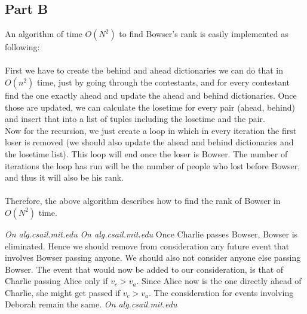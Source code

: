 \documentclass[12pt,twoside]{article}
\begin{document}
\begin{problems}
\section*{Part B}

\problem
\begin{problemparts}
\problempart 

An algorithm of time $O(N^2)$ to find Bowser's rank is easily implemented as following:\\\\
First we have to create the behind and ahead dictionaries we can do that in $O(n^2)$ time, just by going through the contestants, and for every contestant find the one exactly ahead and update the ahead and behind dictionaries. Once those are updated, we can calculate the losetime for every pair (ahead, behind) and insert that into a list of tuples including the losetime and the pair. 
\\ Now for the recursion, we just create a loop in which in every iteration the first loser is removed (we should also update the ahead and behind dictionaries and the losetime list). This loop will end once the loser is Bowser. The number of iterations the loop has run will be the number of people who lost before Bowser, and thus it will also be his rank. \\\\

Therefore, the above algorithm describes how to find the rank of Bowser in $O(N^2)$ time.

\problempart \emph{On alg.csail.mit.edu}
\problempart \emph{On alg.csail.mit.edu}
\problempart 
Once Charlie passes Bowser, Bowser is eliminated. Hence we should remove from consideration any future event that involves Bowser passing anyone. We should also not consider anyone else passing Bowser. The event that would now be added to our consideration, is that of Charlie passing Alice only if $v_c>v_a$. Since Alice now is the one directly ahead of Charlie, she might get passed if $v_c>v_a$. The consideration for events involving Deborah remain the same.
\problempart \emph{On alg.csail.mit.edu}
\end{problemparts}

\end{problems}
\end{document}
